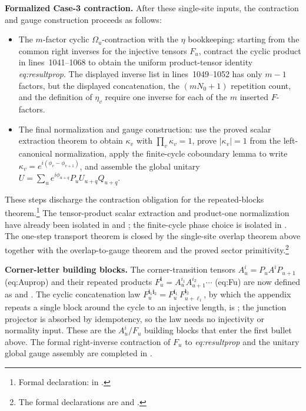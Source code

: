 \documentclass{article}
\begin{document}
\textbf{Formalized Case-3 contraction.} After these single-site inputs, the
contraction and gauge construction proceeds as follows:
\begin{itemize}
  \item The $m$-factor cyclic $\Omega_u$-contraction with the $\eta$ bookkeeping:
    starting from the common right inverses for the injective tensors $F_u$,
    contract the cyclic product in lines~1041--1068 to obtain the uniform
    product-tensor identity \emph{eq:resultprop}. The displayed inverse list
    in lines~1049--1052 has only $m-1$ factors, but the displayed
    concatenation, the $(mN_0+1)$ repetition count, and the definition of
    $\eta_v$ require one inverse for each of the $m$ inserted $F$-factors.
  \item The final normalization and gauge construction: use the proved scalar
    extraction theorem to obtain $\kappa_v$ with $\prod_v\kappa_v=1$, prove
    $|\kappa_v|=1$ from the left-canonical normalization, apply the finite-cycle
    coboundary lemma to write $\kappa_v=e^{i(\phi_v-\phi_{v+1})}$, and assemble
    the global unitary
    $U=\sum_u e^{i\phi_{u+q}}P_uU_{u+q}Q_{u+q}$.
\end{itemize}
These steps discharge the contraction obligation for the repeated-blocks
theorem.\footnote{Formal declaration:
 in
.} The tensor-product scalar
extraction and product-one normalization have already been isolated in
 and
;
the finite-cycle phase choice is isolated in
. The
one-step transport theorem is closed by the single-site overlap theorem above
together with the overlap-to-gauge theorem and the proved sector primitivity.\footnote{
The formal declarations are
 and
.}

\textbf{Corner-letter building blocks.} The corner-transition tensors
$A_u^i=P_uA^iP_{u+1}$ (eq:Auprop) and their repeated products
$F_u^{\mathbf i}=A_u^{i_1}A_{u+1}^{i_2}\cdots$ (eq:Fu) are now defined as
 and . The cyclic
concatenation law $F_u^{\mathbf{i}_1\mathbf{i}_2}
=F_u^{\mathbf i_1}\,F_{u+\ell_1}^{\mathbf i_2}$, by which the appendix repeats a
single block around the cycle to an injective length, is
; the junction projector is absorbed by
idempotency, so the law needs no injectivity or normality input. These are the
$A_u^i/F_u$ building blocks that enter the first bullet above. The formal
right-inverse contraction of $F_u$ to \emph{eq:resultprop} and the unitary
global gauge assembly are completed in
.
\end{document}
